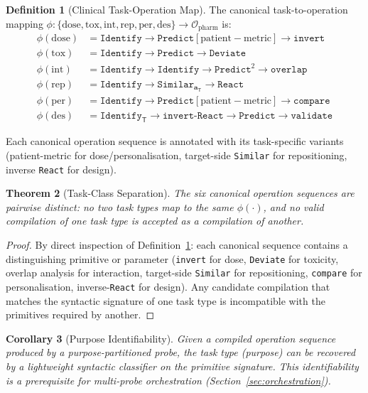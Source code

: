 \documentclass[11pt,twocolumn,a4paper]{article}
\newtheorem{theorem}{Theorem}[section]
\newtheorem{corollary}[theorem]{Corollary}
\theoremstyle{definition}
\newtheorem{definition}[theorem]{Definition}
\theoremstyle{remark}
\newcommand{\opspace}{\mathcal{O}}
\newcommand{\targaddr}{\mathbf{a}_{\mathsf{T}}}
\begin{document}
\begin{definition}[Clinical Task-Operation Map]
\label{def:task_op_map}
The canonical task-to-operation mapping $\phi: \{\mathrm{dose}, \mathrm{tox}, \mathrm{int}, \mathrm{rep}, \mathrm{per}, \mathrm{des}\} \to \opspace_{\mathrm{pharm}}$ is:
\begin{align}
\phi(\mathrm{dose}) &= \texttt{Identify} \to \texttt{Predict}[\mathrm{patient-metric}] \to \texttt{invert} \\
\phi(\mathrm{tox}) &= \texttt{Identify} \to \texttt{Predict} \to \texttt{Deviate} \\
\phi(\mathrm{int}) &= \texttt{Identify} \to \texttt{Identify} \to \texttt{Predict}^2 \to \texttt{overlap} \\
\phi(\mathrm{rep}) &= \texttt{Identify} \to \texttt{Similar}_{\targaddr} \to \texttt{React} \\
\phi(\mathrm{per}) &= \texttt{Identify} \to \texttt{Predict}[\mathrm{patient-metric}] \to \texttt{compare} \\
\phi(\mathrm{des}) &= \texttt{Identify}_\mathsf{T} \to \texttt{invert-React} \to \texttt{Predict} \to \texttt{validate}
\end{align}
\end{definition}

Each canonical operation sequence is annotated with its task-specific variants (patient-metric for dose/personalisation, target-side \texttt{Similar} for repositioning, inverse \texttt{React} for design).

\begin{theorem}[Task-Class Separation]
\label{thm:task_separation}
The six canonical operation sequences are pairwise distinct: no two task types map to the same $\phi(\cdot)$, and no valid compilation of one task type is accepted as a compilation of another.
\end{theorem}

\begin{proof}
By direct inspection of Definition~\ref{def:task_op_map}: each canonical sequence contains a distinguishing primitive or parameter (\texttt{invert} for dose, \texttt{Deviate} for toxicity, overlap analysis for interaction, target-side \texttt{Similar} for repositioning, \texttt{compare} for personalisation, inverse-\texttt{React} for design). Any candidate compilation that matches the syntactic signature of one task type is incompatible with the primitives required by another.
\end{proof}

\begin{corollary}[Purpose Identifiability]
\label{cor:purpose_identifiability}
Given a compiled operation sequence produced by a purpose-partitioned probe, the task type (purpose) can be recovered by a lightweight syntactic classifier on the primitive signature. This identifiability is a prerequisite for multi-probe orchestration (Section~\ref{sec:orchestration}).
\end{corollary}
\end{document}
